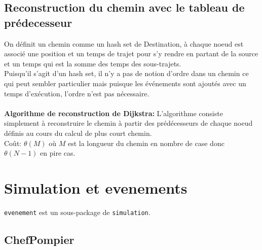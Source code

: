 \documentclass[12pt,a4paper]{article}
\begin{document}
\subsection{Reconstruction du chemin avec le tableau de prédecesseur}

On définit un chemin comme un hash set de Destination, à chaque noeud est associé une position et un temps de trajet pour s'y rendre en partant de la source et un temps qui est la somme des temps des sous-trajets.\\
Puisqu'il s'agit d'un hash set, il n'y a pas de notion d'ordre dans un chemin ce qui peut sembler particulier mais puisque les événements sont ajoutés avec un temps d'exécution, l'ordre n'est pas nécessaire.\\\\
\textbf{Algorithme de reconstruction de Dijkstra:} L'algorithme consiste simplement à reconstruire le chemin à partir des prédécesseurs de chaque noeud définis au cours du calcul de plus court chemin.\\
Coût: $\theta(M)$ où $M$ est la longueur du chemin en nombre de case donc $\theta(N-1)$ en pire cas.

\section{Simulation et evenements}

\verb?evenement? est un sous-package de \verb?simulation?.

\subsection{ChefPompier}
\end{document}
